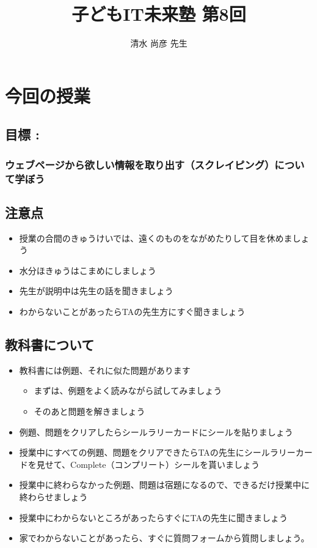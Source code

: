 \documentclass[a4paper,12pt,dvipdfmx]{jarticle}
\title{\Huge\bf\vspace{70mm} 子どもIT未来塾 第8回}
\author{
清水 尚彦 先生}
\date{}
\begin{document}
\clearpage\setcounter{page}{1}\pagestyle{Standard}
\maketitle
\thispagestyle{FirstPage}

\bigskip

\clearpage\section{今回の授業}
\subsection*{目標 : }
\subsubsection*{ウェブページから欲しい情報を取り出す（スクレイピング）について学ぼう}
\subsection*{注意点}
\begin{itemize}
\item
授業の合間のきゅうけいでは、遠くのものをながめたりして目を休めましょう
\item 水分ほきゅうはこまめにしましょう
\item
先生が説明中は先生の話を聞きましょう
\item
わからないことがあったらTAの先生方にすぐ聞きましょう
\end{itemize}
\subsection*{教科書について}
\begin{itemize}
\item
教科書には例題、それに似た問題があります

\begin{itemize}
\item
まずは、例題をよく読みながら試してみましょう
\item そのあと問題を解きましょう
\end{itemize}
\item
例題、問題をクリアしたらシールラリーカードにシールを貼りましょう
\item
授業中にすべての例題、問題をクリアできたらTAの先生にシールラリーカードを見せて、Complete（コンプリート）シールを貰いましょう
\item
授業中に終わらなかった例題、問題は宿題になるので、できるだけ授業中に終わらせましょう
\item
授業中にわからないところがあったらすぐにTAの先生に聞きましょう
\item
家でわからないことがあったら、すぐに質問フォームから質問しましょう。
\end{itemize}
\end{document}
